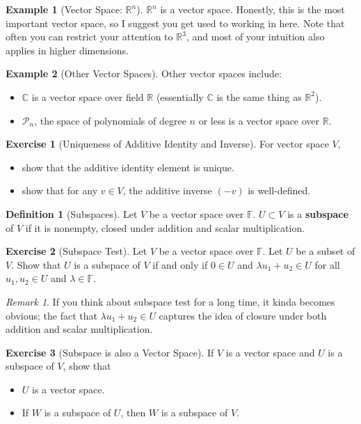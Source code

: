 \documentclass[12pt, a4paper]{article}
\newcommand{\R}{\mathbb{R}}
\theoremstyle{remark}
\newtheorem{remark}{Remark}
\theoremstyle{definition}
\newtheorem{definition}{Definition}
\newtheorem{example}{Example}
\newtheorem{exercise}{Exercise}
\numberwithin{equation}{section}
\numberwithin{definition}{section}
\numberwithin{example}{section}
\numberwithin{exercise}{section}
\numberwithin{remark}{section}
\numberwithin{figure}{section}
\begin{document}
\begin{example}[Vector Space: $\R^n$]
    $\R^n$ is a vector space.
    Honestly, this is the most important vector space, so I suggest you get used to working in here.
    Note that often you can restrict your attention to $\R^3$, and most of your intuition also applies in higher dimensions.
\end{example}
\begin{example}[Other Vector Spaces]
    Other vector spaces include:
    \begin{itemize}
        \item $\mathbb{C}$ is a vector space over field $\R$ (essentially $\mathbb{C}$ is the same thing as $\R^2$).
        \item $\mathcal{P}_n$, the space of polynomials of degree $n$ or less is a vector space over $\R$.
    \end{itemize}
\end{example}
\begin{exercise}[Uniqueness of Additive Identity and Inverse]
    For vector space $V$, 
    \begin{itemize}
            \item show that the additive identity element is unique.
            \item show that for any $v \in V$, the additive inverse $(-v)$ is well-defined.
    \end{itemize}
\end{exercise}
\begin{definition}[Subspaces]
    Let $V$ be a vector space over $\mathbb{F}$. $U \subset V$ is a \textbf{subspace} of $V$ if it is nonempty, closed under addition and scalar multiplication.
\end{definition}
\begin{exercise}[Subspace Test]
    Let $V$ be a vector space over $\mathbb{F}$.
    Let $U$ be a subset of $V$.
    Show that $U$ is a subspace of $V$ if and only if $0 \in U$ and $\lambda u_1 + u_2 \in U$ for all $u_1, u_2 \in U$ and $\lambda \in \mathbb{F}$.
\end{exercise}
\begin{remark}
    If you think about subspace test for a long time, it kinda becomes obvious; the fact that $\lambda u_1 + u_2 \in U$ captures the idea of closure under both addition and scalar multiplication.
\end{remark}
\begin{exercise}[Subspace is also a Vector Space]
    If $V$ is a vector space and $U$ is a subspace of $V$,
    show that
    \begin{itemize}
        \item $U$ is a vector space.
        \item If $W$ is a subspace of $U$, then $W$ is a subspace of $V$.
    \end{itemize}
\end{exercise}
\end{document}
